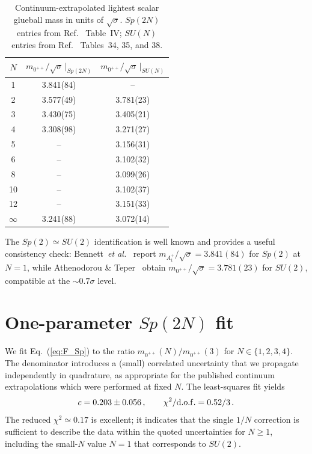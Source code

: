 \documentclass[aps,prd,reprint,nofootinbib,superscriptaddress,floatfix]{revtex4-2}
\begin{document}
\begin{table}
\centering
\caption{Continuum-extrapolated lightest scalar glueball mass in units of
$\sqrt{\sigma}$.  $Sp(2N)$ entries from Ref.~\cite{BennettHolligan2021}
Table~IV; $SU(N)$ entries from Ref.~\cite{AthenodorouTeper2021}
Tables~34, 35, and 38.}
\label{tab:data}
\begin{tabular}{c c c}
\toprule
$N$        & $m_{0^{++}}/\sqrt{\sigma}\,|_{Sp(2N)}$ & $m_{0^{++}}/\sqrt{\sigma}\,|_{SU(N)}$ \\
\midrule
1          & 3.841(84)  & --          \\
2          & 3.577(49)  & 3.781(23)   \\
3          & 3.430(75)  & 3.405(21)   \\
4          & 3.308(98)  & 3.271(27)   \\
5          & --         & 3.156(31)   \\
6          & --         & 3.102(32)   \\
8          & --         & 3.099(26)   \\
10         & --         & 3.102(37)   \\
12         & --         & 3.151(33)   \\
$\infty$   & 3.241(88)  & 3.072(14)   \\
\bottomrule
\end{tabular}
\end{table}

The $Sp(2)\simeq SU(2)$ identification is well known and provides a
useful consistency check: Bennett~\emph{et al.}~\cite{BennettHolligan2021}
report $m_{A_1^+}/\sqrt{\sigma} = 3.841(84)$ for $Sp(2)$ at $N=1$, while
Athenodorou \& Teper~\cite{AthenodorouTeper2021} obtain
$m_{0^{++}}/\sqrt{\sigma} = 3.781(23)$ for $SU(2)$, compatible at the
$\sim\!0.7\sigma$ level.

\section{One-parameter $Sp(2N)$ fit}\label{sec:fitSp}
We fit Eq.~(\ref{eq:F_Sp}) to the ratio
$m_{0^{++}}(N)/m_{0^{++}}(3)$ for $N \in \{1,2,3,4\}$. The denominator
introduces a (small) correlated uncertainty that we propagate independently
in quadrature, as appropriate for the published continuum extrapolations
which were performed at fixed $N$. The least-squares fit yields
\begin{equation}
   c = 0.203 \pm 0.056\,, \qquad
   \chi^{2}/{\rm d.o.f.} = 0.52/3\,.
   \label{eq:Sp_result}
\end{equation}
The reduced $\chi^2 \simeq 0.17$ is excellent; it indicates that the
single $1/N$ correction is sufficient to describe the data within the
quoted uncertainties for $N \geq 1$, including the small-$N$ value
$N=1$ that corresponds to $SU(2)$.
\end{document}
